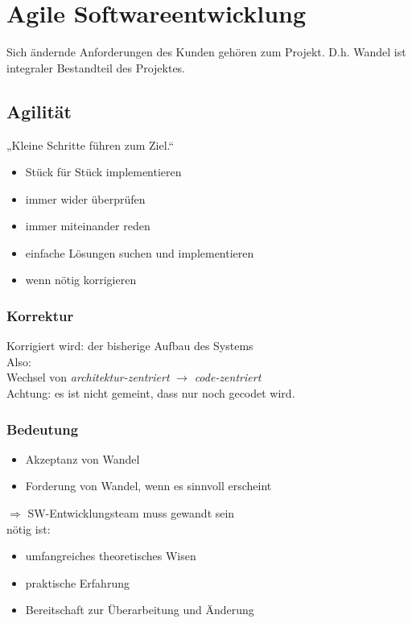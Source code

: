 \chapter{Agile Softwareentwicklung}
Sich ändernde Anforderungen des Kunden gehören zum Projekt. D.h. Wandel ist integraler Bestandteil des Projektes.

\section{Agilität}
„Kleine Schritte führen zum Ziel.“
\begin{itemize}
\item Stück für Stück implementieren
\item immer wider überprüfen
\item immer miteinander reden
\item einfache Lösungen suchen und implementieren
\item wenn nötig korrigieren
\end{itemize}
\subsection{Korrektur}
Korrigiert wird: der bisherige Aufbau des Systems\\
Also:\\
Wechsel von \emph{architektur-zentriert} $\to$ \emph{code-zentriert}\\
Achtung: es ist nicht gemeint, dass nur noch gecodet wird.

\subsection{Bedeutung}
\begin{itemize}
\item Akzeptanz von Wandel
\item Forderung von Wandel, wenn es sinnvoll erscheint
\end{itemize}
$\Rightarrow$ SW-Entwicklungsteam muss gewandt sein\\
nötig ist:
\begin{itemize}
\item umfangreiches theoretisches Wisen
\item praktische Erfahrung
\item Bereitschaft zur Überarbeitung und Änderung
\end{itemize}


